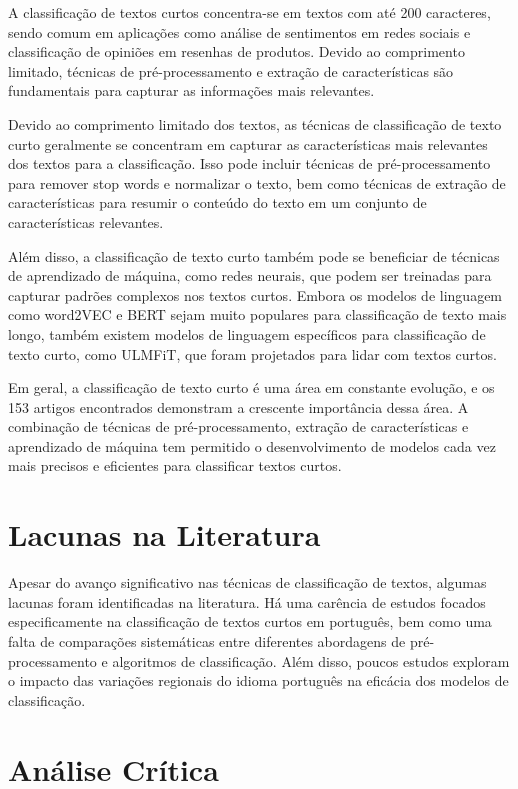 A classificação de textos curtos concentra-se em textos com até 200 caracteres, sendo comum em aplicações como análise de sentimentos em redes sociais e classificação de opiniões em resenhas de produtos. Devido ao comprimento limitado, técnicas de pré-processamento e extração de características são fundamentais para capturar as informações mais relevantes.

Devido ao comprimento limitado dos textos, as técnicas de classificação de texto curto geralmente se concentram em capturar as características mais relevantes dos textos para a classificação. Isso pode incluir técnicas de pré-processamento para remover stop words e normalizar o texto, bem como técnicas de extração de características para resumir o conteúdo do texto em um conjunto de características relevantes.

Além disso, a classificação de texto curto também pode se beneficiar de técnicas de aprendizado de máquina, como redes neurais, que podem ser treinadas para capturar padrões complexos nos textos curtos. Embora os modelos de linguagem como word2VEC e BERT sejam muito populares para classificação de texto mais longo, também existem modelos de linguagem específicos para classificação de texto curto, como ULMFiT, que foram projetados para lidar com textos curtos.

Em geral, a classificação de texto curto é uma área em constante evolução, e os 153 artigos encontrados demonstram a crescente importância dessa área. A combinação de técnicas de pré-processamento, extração de características e aprendizado de máquina tem permitido o desenvolvimento de modelos cada vez mais precisos e eficientes para classificar textos curtos.

\section{Lacunas na Literatura}

Apesar do avanço significativo nas técnicas de classificação de textos, algumas lacunas foram identificadas na literatura. Há uma carência de estudos focados especificamente na classificação de textos curtos em português, bem como uma falta de comparações sistemáticas entre diferentes abordagens de pré-processamento e algoritmos de classificação. Além disso, poucos estudos exploram o impacto das variações regionais do idioma português na eficácia dos modelos de classificação.

\section{Análise Crítica}

